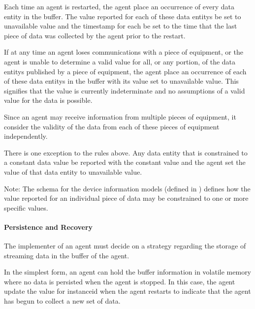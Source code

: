 Each time an \gls{agent} is restarted, the \gls{agent} \MUST place an occurrence of every \gls{data entity} in the \gls{buffer}.  The value reported for each of these \glspl{data entity} \MUST be set to \gls{unavailable value} and the \gls{timestamp} for each \MUST be set to the time that the last piece of data was collected by the \gls{agent} prior to the restart.

If at any time an \gls{agent} loses communications with a piece of equipment, or the \gls{agent} is unable to determine a valid value for all, or any portion, of the \glspl{data entity} published by a piece of equipment, the \gls{agent} \MUST place an occurrence of each of these \glspl{data entity} in the \gls{buffer} with its value set to \gls{unavailable value}.  This signifies that the value is currently indeterminate and no assumptions of a valid value for the data is possible.

Since an \gls{agent} may receive information from multiple pieces of equipment, it \MUST consider the validity of the data from each of these pieces of equipment independently.

There is one exception to the rules above.  Any \gls{data entity} that is constrained to a constant data value \MUST be reported with the constant value and the \gls{agent} \MUSTNOT set the value of that \gls{data entity} to \gls{unavailable value}.

\begin{note}
Note:	The schema for the \glspl{device information model} (defined in ) defines how the value reported for an individual piece of data may be constrained to one or more specific values.

\end{note}

\paragraph{Persistence and Recovery}\mbox{}

The implementer of an \gls{agent} must decide on a strategy regarding the storage of \gls{streaming data} in the \gls{buffer} of the \gls{agent}.

In the simplest form, an \gls{agent} can hold the \gls{buffer} information in volatile memory where no data is persisted when the \gls{agent} is stopped.  In this case, the \gls{agent} \MUST update the value for \gls{instanceid} when the \gls{agent} restarts to indicate that the \gls{agent} has begun to collect a new set of data.

